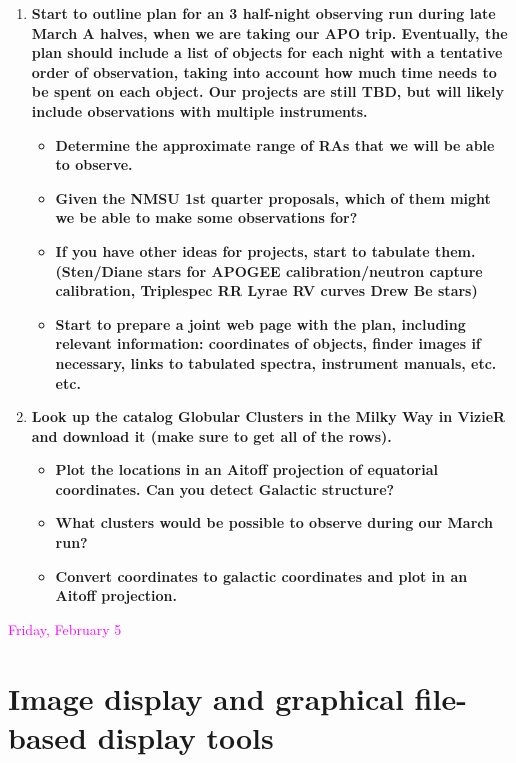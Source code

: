 \documentclass{article}
\begin{document}
\begin{enumerate}[1.]
    \item \textbf{Start to outline plan for an 3 half-night observing
    run during late March A halves, when we are taking our APO trip.
    Eventually, the plan should include a list of objects for each
    night with a tentative order of observation, taking into account
    how much time needs to be spent on each object. Our projects are
    still TBD, but will likely include observations with multiple
    instruments.}
        \begin{itemize}
            \item \textbf{Determine the approximate range of RAs that
            we will be able to observe. }
            \item \textbf{Given the NMSU 1st quarter proposals, which
            of them might we be able to make some observations for?}
            \item \textbf{If you have other ideas for projects, start
            to tabulate them. (Sten/Diane stars for APOGEE
            calibration/neutron capture calibration, Triplespec RR
            Lyrae RV curves Drew Be stars)}
            \item \textbf{Start to prepare a joint web page with the
            plan, including relevant information: coordinates of
            objects, finder images if necessary, links to tabulated
            spectra, instrument manuals, etc. etc. }
        \end{itemize}

    \item \textbf{Look up the catalog Globular Clusters in the Milky
    Way in VizieR and download it (make sure to get all of the rows).}
        \begin{itemize}
            \item \textbf{Plot the locations in an Aitoff projection
            of equatorial coordinates. Can you detect Galactic
            structure?}
            \item \textbf{What clusters would be possible to observe
            during our March run? }
            \item \textbf{Convert coordinates to galactic coordinates
            and plot in an Aitoff projection.}
        \end{itemize}

\end{enumerate}

\newpage
\textcolor{magenta}{Friday, February 5}

\section*{Image display and graphical file-based display tools}
\end{document}
